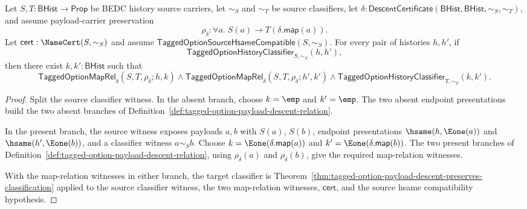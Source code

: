 \begin{theorem}
\label{thm:tagged-option-payload-descent-total-classifier-transport}
Let $S,T:\mathsf{BHist}\to\mathsf{Prop}$ be BEDC history source carriers, let
$\sim_S$ and $\sim_T$ be source classifiers, let
$\delta:\mathsf{DescentCertificate}(\mathsf{BHist},\mathsf{BHist},\sim_S,\sim_T)$,
and assume payload-carrier preservation
$$
\rho_{\delta}:\forall a.\;S(a)\to T(\delta.\mathsf{map}(a)).
$$
Let $\mathsf{cert}:\NameCert(S,\sim_S)$ and assume
$\mathsf{TaggedOptionSourceHsameCompatible}(S,\sim_S)$. For every pair of
histories $h,h'$, if
$$
\mathsf{TaggedOptionHistoryClassifier}_{S,\sim_S}(h,h'),
$$
then there exist $k,k':\mathsf{BHist}$ such that
$$
\mathsf{TaggedOptionMapRel}_{\delta}(S,T,\rho_{\delta};h,k)\land
\mathsf{TaggedOptionMapRel}_{\delta}(S,T,\rho_{\delta};h',k')\land
\mathsf{TaggedOptionHistoryClassifier}_{T,\sim_T}(k,k').
$$
\end{theorem}
\begin{proof}
Split the source classifier witness. In the absent branch, choose $k=\emp$ and
$k'=\emp$. The two absent endpoint presentations build the two absent branches
of Definition~\ref{def:tagged-option-payload-descent-relation}.

In the present branch, the source witness exposes payloads $a,b$ with $S(a)$,
$S(b)$, endpoint presentations $\hsame(h,\Eone(a))$ and
$\hsame(h',\Eone(b))$, and a classifier witness $a\sim_S b$. Choose
$k=\Eone(\delta.\mathsf{map}(a))$ and
$k'=\Eone(\delta.\mathsf{map}(b))$. The two present branches of
Definition~\ref{def:tagged-option-payload-descent-relation}, using
$\rho_{\delta}(a)$ and $\rho_{\delta}(b)$, give the required map-relation
witnesses.

With the map-relation witnesses in either branch, the target classifier is
Theorem~\ref{thm:tagged-option-payload-descent-preserves-classification}
applied to the source classifier witness, the two map-relation witnesses,
$\mathsf{cert}$, and the source hsame compatibility hypothesis.
\end{proof}

